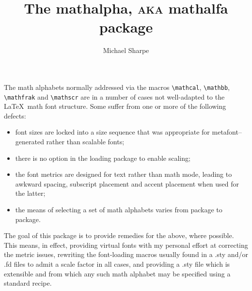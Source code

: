 \documentclass[11pt]{article}
\title{The \textsf{mathalpha,} \textsc{aka} \textsf{mathalfa} package}
\author{Michael Sharpe}
\date{}
\begin{document}
\maketitle

The math alphabets normally addressed via the macros \verb|\mathcal|, \verb|\mathbb|, \verb|\mathfrak| and \verb|\mathscr| are in a number of cases not well-adapted to the \LaTeX\ math font structure. Some suffer from one or more of the following defects:
\begin{itemize}
\item
font sizes are locked into  a size sequence that was appropriate for \textsf{metafont}--generated rather than  scalable fonts;
\item there is no option in the loading package to enable scaling;
\item  the font metrics are designed for text rather than math mode, leading to awkward spacing, subscript placement and accent placement when used for the latter;
\item the means of selecting a set of math alphabets varies from package to package.
\end{itemize}
The goal of this package is to provide remedies for the above, where  possible. This means, in effect, providing virtual fonts with my personal effort at correcting the metric issues, rewriting the font-loading macros usually found in a \textsf{.sty} and/or \textsf{.fd} files to admit a scale factor in all cases, and providing a \textsf{.sty} file which is extensible and from which any such math alphabet may be specified using a standard recipe. 
\end{document}
